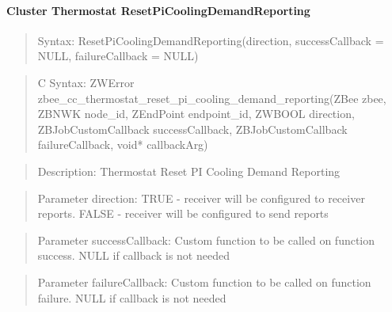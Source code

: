 \paragraph{Cluster Thermostat ResetPiCoolingDemandReporting}
\begin{quote}Syntax: ResetPiCoolingDemandReporting(direction, successCallback = NULL, failureCallback = NULL)\end{quote}
\begin{quote}C Syntax: ZWError zbee\_cc\_thermostat\_reset\_pi\_cooling\_demand\_reporting(ZBee zbee, ZBNWK node\_id, ZEndPoint endpoint\_id, ZWBOOL direction, ZBJobCustomCallback successCallback, ZBJobCustomCallback failureCallback, void* callbackArg)\end{quote}
\begin{quote}Description: Thermostat Reset PI Cooling Demand Reporting\end{quote}
\begin{quote}Parameter direction: TRUE  - receiver will be configured to receiver reports. FALSE - receiver will be configured to send reports\end{quote}
\begin{quote}Parameter successCallback: Custom function to be called on function success. NULL if callback is not needed\end{quote}
\begin{quote}Parameter failureCallback: Custom function to be called on function failure. NULL if callback is not needed\end{quote}


